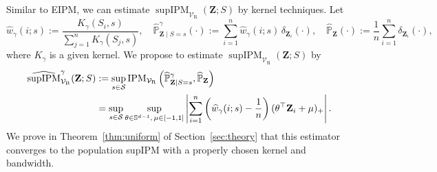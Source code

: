 \documentclass{article} %
\begin{document}
Similar to EIPM, we can estimate $\operatorname{supIPM}_{\mathcal{V}_{\mathrm{R}}}(\mathbf{Z};S)$ by kernel techniques. Let
\begin{equation}
  \widehat{w}_{\gamma}(i;s)
  :=\frac{K_{\gamma}(S_i,s)}{\sum_{j=1}^n K_{\gamma}(S_j,s)},
  \quad
  \widehat{\mathbb{P}}^{\gamma}_{\mathbf{Z}\mid S=s}(\cdot)
  :=\sum_{i=1}^n\widehat{w}_{\gamma}(i;s)\,
  \delta_{\mathbf{Z}_i}(\cdot),
  \quad
  \widehat{\mathbb{P}}_{\mathbf{Z}}(\cdot)
  :=\frac{1}{n}\sum_{i=1}^n\delta_{\mathbf{Z}_i}(\cdot),
  \label{eq:supipm-estimators}
\end{equation}
where $K_{\gamma}$ is a given kernel.  We propose to estimate $\operatorname{supIPM}_{\mathcal{V}_{\mathrm{R}}}(\mathbf{Z};S)$ by
\begin{align}
  \widehat{\operatorname{supIPM}}^{\gamma}_{\mathcal{V}_{\mathrm{R}}}
  (\mathbf{Z};S)
  &:=\sup_{s\in\mathcal{S}}
  \operatorname{IPM}_{\mathcal{V}_{\mathrm{R}}}
  \left(\widehat{\mathbb{P}}^{\gamma}_{\mathbf{Z}\mid S=s},
        \widehat{\mathbb{P}}_{\mathbf{Z}}\right) \notag\\
  &=\sup_{s\in\mathcal{S}}
    \sup_{\theta\in\mathbb{S}^{d-1},\,\mu\in[-1,1]}
  \left|
    \sum_{i=1}^n
    \left(\widehat{w}_{\gamma}(i;s)-\frac{1}{n}\right)
    (\theta^\top\mathbf{Z}_i+\mu)_+
  \right|.
  \label{eq:empirical-supipm}
\end{align}
We prove in Theorem~\ref{thm:uniform} of Section~\ref{sec:theory} that this estimator converges to the population supIPM
with a properly chosen kernel and bandwidth.
\end{document}
